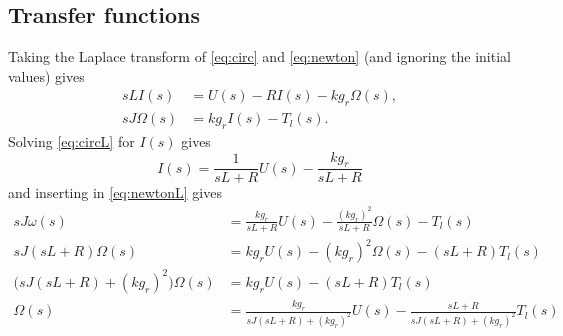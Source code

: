 \documentclass[letterpaper]{scrartcl}
\begin{document}
\subsection*{Transfer functions}
\label{sec:org51b2c71}
Taking the Laplace transform of \eqref{eq:circ} and \eqref{eq:newton} (and ignoring the initial values) gives
\begin{align}
sL I(s) &= U(s) - RI(s) - kg_r\Omega(s), \\
\label{eq:circL}
sJ\Omega(s) &= kg_r I(s) - T_l(s).
\label{eq:newtonL}
\end{align}
Solving \eqref{eq:circL} for \(I(s)\) gives
\[ I(s) = \frac{1}{sL+R}U(s) - \frac{kg_r}{sL + R} \]
and inserting in \eqref{eq:newtonL} gives
\begin{equation}
\begin{aligned}
sJ\omega(s) &= \frac{k g_r}{sL+R}U(s) - \frac{(kg_r)^2}{sL+R}\Omega(s) - T_l(s)\\
sJ(sL+R)\Omega(s) &= k g_rU(s) - (kg_r)^2\Omega(s) - (sL+R)T_l(s)\\
\big(sJ(sL+R) + (k g_r)^2\big)\Omega(s) &= k g_rU(s) - (sL+R)T_l(s)\\
\Omega(s) &= \frac{k g_r}{sJ(sL+R) + (k g_r)^2}U(s) - \frac{sL+R}{sJ(sL+R) + (k g_r)^2}T_l(s)
\end{aligned}
\end{equation}
\end{document}
